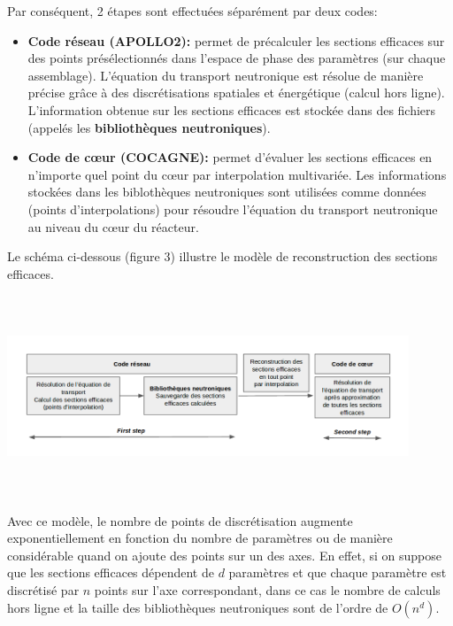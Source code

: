 \newpage
Par conséquent, 2 étapes sont effectuées séparément par deux codes:
\begin{itemize}
		\item \textbf{Code réseau (APOLLO2):} permet de précalculer les sections efficaces sur des points
		présélectionnés dans l'espace de phase des paramètres (sur chaque assemblage). L'équation du transport neutronique est
		résolue de manière précise grâce à des discrétisations spatiales et énergétique (calcul hors ligne).
		L'information obtenue sur les sections efficaces est stockée dans des fichiers (appelés les \textbf{bibliothèques neutroniques}).
		\item \textbf{Code de cœur (COCAGNE):} permet d'évaluer les sections efficaces en n'importe quel point du cœur par interpolation multivariée.
		Les informations stockées dans les biblothèques neutroniques sont utilisées comme données (points d'interpolations)
		pour résoudre l'équation du transport neutronique au niveau du cœur du réacteur.
\end{itemize}
Le schéma ci-dessous (figure 3) illustre le modèle de reconstruction des sections efficaces.
\begin{center}
\includegraphics[height=6cm,width=12cm]{images/figure1.png}
\end{center}

\hspace{0.5cm}
Avec ce modèle, le nombre de points de discrétisation augmente exponentiellement en fonction
du nombre de paramètres ou de manière considérable quand on ajoute des points sur un des axes.
En effet, si on suppose que les sections efficaces dépendent de $d$ paramètres et que chaque
paramètre est discrétisé par $n$ points sur l'axe correspondant, dans ce cas le nombre
de calculs hors ligne et la taille des bibliothèques neutroniques sont de l'ordre de $O(n^d)$.

\newpage

